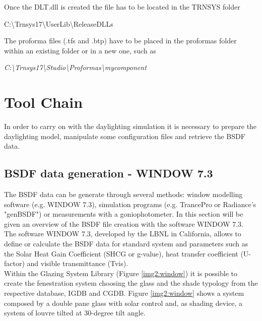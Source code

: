 

Once the DLT.dll is created the file has to be located in the TRNSYS folder \begin{center}
C:\textbackslash Trnsys17\textbackslash UserLib\textbackslash ReleaseDLLs \end{center}
The proforma files (.tfs and .btp) have to be placed in the proformas folder within an existing folder or in a new one, such as \begin{center}
\textit{ C:\textbackslash Trnsys17\textbackslash Studio\textbackslash Proformas\textbackslash mycomponent} 
\end{center}

\section{Tool Chain}
In order to carry on with the daylighting simulation it is necessary to prepare the daylighting model, manipulate some configuration files and retrieve the BSDF data.

\subsection{BSDF data generation - WINDOW 7.3}
The BSDF data can be generate through several methods: window modelling software (e.g. WINDOW 7.3), simulation programs (e.g. TrancePro or Radiance's "genBSDF") or measurements with a goniophotometer. In this section will be given an overview of the BSDF file creation with the software WINDOW 7.3.\\

The software WINDOW 7.3, developed by the LBNL in California, allows to define or calculate the BSDF data for standard system and parameters such as the Solar Heat Gain Coefficient (SHCG or g-value), heat transfer coefficient (U-factor) and visible transmittance (Tvis).\\
Within the Glazing System Library (Figure \ref{img2:window}) it is possible to create the fenestration system choosing the glass and the shade typology from the respective database, IGDB and CGDB. Figure \ref{img2:window} shows a system composed by a double pane glass with solar control and, as shading device, a system of louvre tilted at 30-degree tilt angle.
 
